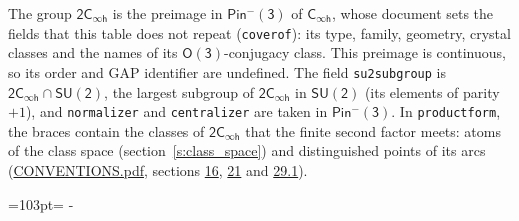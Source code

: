 \documentclass[10pt,a4paper]{article}
\newcommand{\needspace}[1]{\par\penalty-100\begingroup\dimen0=#1\relax\dimen2=\pagegoal
  \advance\dimen2-\pagetotal\ifdim\dimen0>\dimen2\relax\ifdim\dimen2>0pt\vfil\break\fi\fi
  \endgroup}
\numberwithin{equation}{section}
\newcommand{\grp}[1]{\mathsf{#1}}
\begin{document}
\leavevmode\label{n:group.preimage}The group $\grp{2C_{\infty h}}$ is the preimage in $\grp{Pin^{-}(3)}$ of \href{../../../rotation/data/pdf/Cinfh.pdf}{$\grp{C_{\infty h}}$}, whose document sets the fields that this table does not repeat (\texttt{coverof}): its type, family, geometry, crystal classes and the names of its \href{../../../rotation/data/pdf/O3.pdf}{$\grp{O(3)}$}-conjugacy class. This preimage is continuous, so its order and GAP identifier are undefined. The field \texttt{su2subgroup} is $\grp{2C_{\infty h}} \cap \grp{SU(2)}$, the largest subgroup of $\grp{2C_{\infty h}}$ in $\grp{SU(2)}$ (its elements of parity $+1$), and \texttt{normalizer} and \texttt{centralizer} are taken in $\grp{Pin^{-}(3)}$.
In \texttt{productform}, the braces contain the classes of $\grp{2C_{\infty h}}$ that the finite second factor meets: atoms of the class space (section~\ref{s:class_space}) and distinguished points of its arcs (\href{../../CONVENTIONS.pdf}{CONVENTIONS.pdf}, sections \href{../../../rotation/CONVENTIONS.pdf\#conv.16}{16}, \href{../../CONVENTIONS.pdf\#conv.21}{21} and \href{../../CONVENTIONS.pdf\#conv.29.1}{29.1}).
\needspace{103pt}
\end{document}

